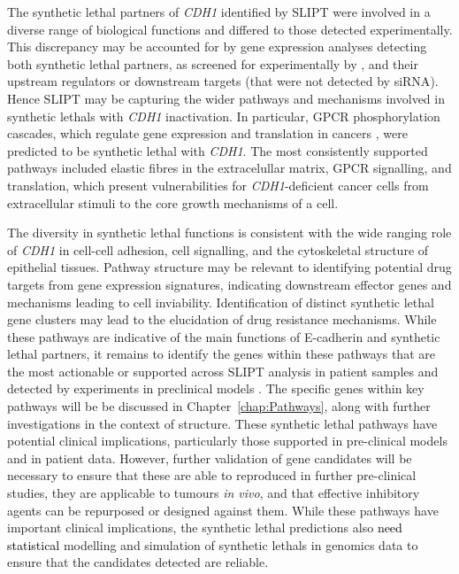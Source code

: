 The \gls{synthetic lethal} partners of \textit{CDH1} identified by \gls{SLIPT} were involved in a diverse range of biological functions and differed to those detected experimentally. This discrepancy may be accounted for by \gls{gene expression} analyses detecting both \gls{synthetic lethal} partners, as screened for experimentally by \citet{Telford2015}, and their upstream regulators or downstream targets (that were not detected by \gls{siRNA}). Hence \gls{SLIPT} may be capturing the wider \glspl{pathway} and mechanisms involved in \glspl{synthetic lethal} with \textit{CDH1} inactivation. In particular, \gls{GPCR} phosphorylation cascades, which regulate \gls{gene expression} and translation in cancers \citep{Gao2015}, were predicted to be \gls{synthetic lethal} with \textit{CDH1}. 
The most consistently supported \glspl{pathway} included elastic fibres in the extracelullar matrix, \gls{GPCR} signalling, and translation, which present vulnerabilities for \textit{CDH1}-deficient cancer cells from extracellular stimuli to the core growth mechanisms of a cell.

The diversity in \gls{synthetic lethal} functions is consistent with the wide ranging role of \textit{CDH1} in cell-cell adhesion, cell signalling, and the cytoskeletal structure of epithelial tissues. Pathway structure may be relevant to identifying potential drug targets from \gls{gene expression} signatures, indicating downstream effector genes and mechanisms leading to cell inviability. Identification of distinct \gls{synthetic lethal} gene clusters may lead to the elucidation of drug resistance mechanisms. While these \glspl{pathway} are indicative of the main functions of \gls{E-cadherin} and \gls{synthetic lethal} partners, it remains to identify the genes within these \glspl{pathway} that are the most actionable or supported across \gls{SLIPT} analysis in patient samples and detected by experiments in preclinical models \citep{Chen2014, Telford2015}.  The specific genes within key \glspl{pathway} will be be discussed in Chapter~\ref{chap:Pathways}, along with further investigations in the context of  structure. These \gls{synthetic lethal} \glspl{pathway} have potential clinical implications, particularly those supported in pre-clinical models and in patient  data. However, further validation of gene candidates will be necessary to ensure that these are able to reproduced in further pre-clinical studies, they are applicable to tumours \textit{in vivo}, and that effective inhibitory agents can be repurposed or designed against them. While these \glspl{pathway} have important clinical implications, the \gls{synthetic lethal} predictions also \textcolor{black}{need statistical} modelling and simulation of \glspl{synthetic lethal} in \glspl{genomic}  data to ensure that the candidates detected are reliable.


